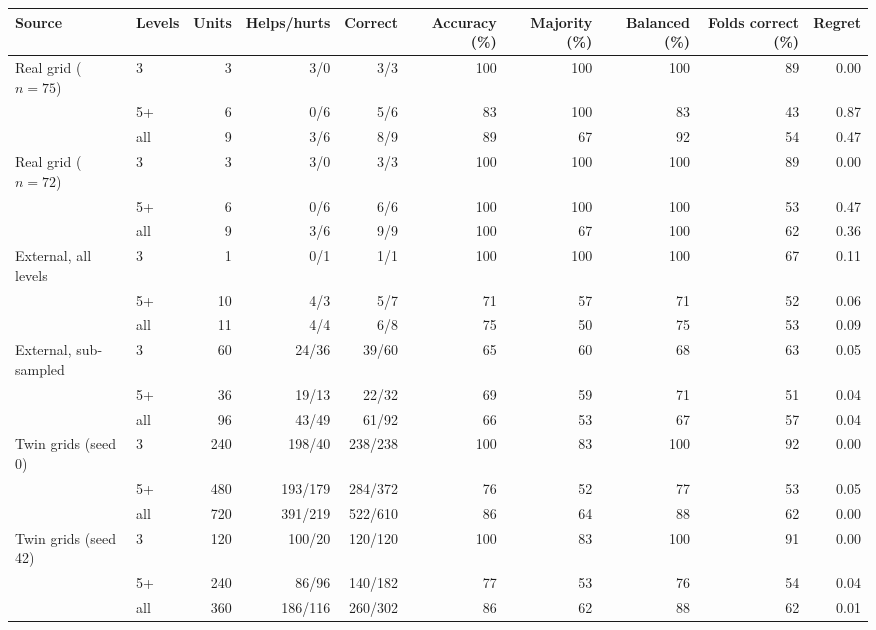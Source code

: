 \begin{tabular}{l l r r r r r r r r}
\toprule
Source & Levels & Units & Helps/hurts & Correct & Accuracy (\%) & Majority (\%) & Balanced (\%) & Folds correct (\%) & Regret \\
\midrule
Real grid ($n=75$) & 3 & 3 & 3/0 & 3/3 & 100 & 100 & 100 & 89 & 0.00 \\
 & 5+ & 6 & 0/6 & 5/6 & 83 & 100 & 83 & 43 & 0.87 \\
 & all & 9 & 3/6 & 8/9 & 89 & 67 & 92 & 54 & 0.47 \\
\addlinespace
Real grid ($n=72$) & 3 & 3 & 3/0 & 3/3 & 100 & 100 & 100 & 89 & 0.00 \\
 & 5+ & 6 & 0/6 & 6/6 & 100 & 100 & 100 & 53 & 0.47 \\
 & all & 9 & 3/6 & 9/9 & 100 & 67 & 100 & 62 & 0.36 \\
\addlinespace
External, all levels & 3 & 1 & 0/1 & 1/1 & 100 & 100 & 100 & 67 & 0.11 \\
 & 5+ & 10 & 4/3 & 5/7 & 71 & 57 & 71 & 52 & 0.06 \\
 & all & 11 & 4/4 & 6/8 & 75 & 50 & 75 & 53 & 0.09 \\
\addlinespace
External, sub-sampled & 3 & 60 & 24/36 & 39/60 & 65 & 60 & 68 & 63 & 0.05 \\
 & 5+ & 36 & 19/13 & 22/32 & 69 & 59 & 71 & 51 & 0.04 \\
 & all & 96 & 43/49 & 61/92 & 66 & 53 & 67 & 57 & 0.04 \\
\addlinespace
Twin grids (seed 0) & 3 & 240 & 198/40 & 238/238 & 100 & 83 & 100 & 92 & 0.00 \\
 & 5+ & 480 & 193/179 & 284/372 & 76 & 52 & 77 & 53 & 0.05 \\
 & all & 720 & 391/219 & 522/610 & 86 & 64 & 88 & 62 & 0.00 \\
\addlinespace
Twin grids (seed 42) & 3 & 120 & 100/20 & 120/120 & 100 & 83 & 100 & 91 & 0.00 \\
 & 5+ & 240 & 86/96 & 140/182 & 77 & 53 & 76 & 54 & 0.04 \\
 & all & 360 & 186/116 & 260/302 & 86 & 62 & 88 & 62 & 0.01 \\
\bottomrule
\end{tabular}
